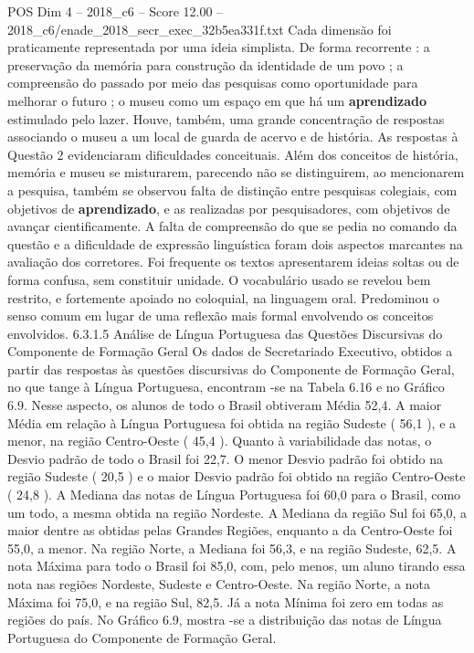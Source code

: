 \begin{textsample}{POS Dim 4 – 2018\_c6 – Score 12.00 – 2018\_c6/enade\_2018\_secr\_exec\_32b5ea331f.txt}
Cada dimensão foi praticamente representada por uma ideia simplista.
De forma recorrente : a preservação da memória para construção da identidade de um povo ; a compreensão do passado por meio das pesquisas como oportunidade para melhorar o futuro ; o museu como um espaço em que há um \textbf{aprendizado} estimulado pelo lazer.
Houve, também, uma grande concentração de respostas associando o museu a um local de guarda de acervo e de história.
As respostas à Questão 2 evidenciaram dificuldades conceituais.
Além dos conceitos de história, memória e museu se misturarem, parecendo não se distinguirem, ao mencionarem a pesquisa, também se observou falta de distinção entre pesquisas colegiais, com objetivos de \textbf{aprendizado}, e as realizadas por pesquisadores, com objetivos de avançar cientificamente.
A falta de compreensão do que se pedia no comando da questão e a dificuldade de expressão linguística foram dois aspectos marcantes na avaliação dos corretores.
Foi frequente os textos apresentarem ideias soltas ou de forma confusa, sem constituir unidade.
O vocabulário usado se revelou bem restrito, e fortemente apoiado no coloquial, na linguagem oral.
Predominou o senso comum em lugar de uma reflexão mais formal envolvendo os conceitos envolvidos. 6.3.1.5 Análise de Língua Portuguesa das Questões Discursivas do Componente de Formação Geral Os dados de Secretariado Executivo, obtidos a partir das respostas às questões discursivas do Componente de Formação Geral, no que tange à Língua Portuguesa, encontram -se na Tabela 6.16 e no Gráfico 6.9.
Nesse aspecto, os alunos de todo o Brasil obtiveram Média 52,4.
A maior Média em relação à Língua Portuguesa foi obtida na região Sudeste ( 56,1 ), e a menor, na região Centro-Oeste ( 45,4 ).
Quanto à variabilidade das notas, o Desvio padrão de todo o Brasil foi 22,7.
O menor Desvio padrão foi obtido na região Sudeste ( 20,5 ) e o maior Desvio padrão foi obtido na região Centro-Oeste ( 24,8 ).
A Mediana das notas de Língua Portuguesa foi 60,0 para o Brasil, como um todo, a mesma obtida na região Nordeste.
A Mediana da região Sul foi 65,0, a maior dentre as obtidas pelas Grandes Regiões, enquanto a da Centro-Oeste foi 55,0, a menor.
Na região Norte, a Mediana foi 56,3, e na região Sudeste, 62,5.
A nota Máxima para todo o Brasil foi 85,0, com, pelo menos, um aluno tirando essa nota nas regiões Nordeste, Sudeste e Centro-Oeste.
Na região Norte, a nota Máxima foi 75,0, e na região Sul, 82,5.
Já a nota Mínima foi zero em todas as regiões do país.
No Gráfico 6.9, mostra -se a distribuição das notas de Língua Portuguesa do Componente de Formação Geral.

\end{textsample}
